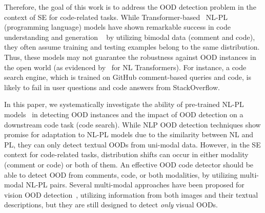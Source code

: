 Therefore, the goal of this work is to address the OOD detection problem in the context of SE for code-related tasks. While Transformer-based~\cite{vaswani2017attention} NL-PL (programming language) models have shown remarkable success in code understanding and generation ~\cite{guo2020graphcodebert, guo2022unixcoder, athena} by utilizing bimodal data (\ie comment and code), they often assume training and testing examples belong to the same distribution. Thus, these models may not guarantee the robustness against OOD instances in the open world (as evidenced by~\cite{hendrycks2020pretrained} for NL Transformers). For instance, a code search engine, which is trained on GitHub comment-based queries and code, is likely to fail in user questions and code answers from StackOverflow. 

In this paper, we systematically investigate the ability of pre-trained NL-PL models~\cite{guo2020graphcodebert, guo2022unixcoder, liu2023contrabert} in detecting OOD instances and the impact of OOD detection on a downstream code task (\ie code search). While NLP OOD detection techniques show promise for adaptation to NL-PL models due to the similarity between NL and PL, they can only detect textual OODs from uni-modal data. However, in the SE context for code-related tasks, distribution shifts can occur in either modality (comment or code) or both of them. An effective OOD code detector should be able to detect OOD from comments, code, or both modalities, by utilizing multi-modal NL-PL pairs. Several multi-modal approaches have been proposed for vision OOD detection~\cite{ming2022delving, esmaeilpour2022zero}, utilizing information from both images and their textual descriptions, but they are still designed to detect \textit{only} visual OODs.






